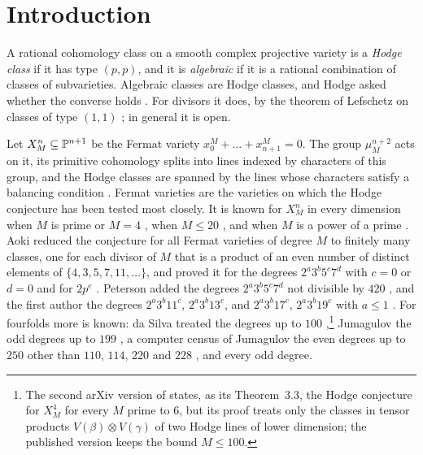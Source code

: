 \section{Introduction}\label{sec:intro}

A rational cohomology class on a smooth complex projective variety is a
\emph{Hodge class} if it has type $(p,p)$, and it is \emph{algebraic} if it
is a rational combination of classes of subvarieties. Algebraic classes are
Hodge classes, and Hodge asked whether the converse holds \cite{Hod52}. For
divisors it does, by the theorem of Lefschetz on classes of type $(1,1)$
\cite{Lef24}; in general it is open.

Let $X^{n}_{M}\subseteq\mathbb{P}^{n+1}$ be the Fermat variety
$x_{0}^{M}+\dots+x_{n+1}^{M}=0$. The group $\mu_{M}^{n+2}$ acts on it, its
primitive cohomology splits into lines indexed by characters of this group,
and the Hodge classes are spanned by the lines whose characters satisfy a
balancing condition \cite{Shi79}. Fermat varieties are the varieties on which
the Hodge conjecture has been tested most closely. It is known for
$X^{n}_{M}$ in every dimension when $M$ is prime or $M=4$
\cite{Ran80,Shi79}, when $M\le20$ \cite{Shi79}, and when $M$ is a power of a
prime \cite{Aok87}. Aoki reduced the conjecture for all Fermat varieties of
degree $M$ to finitely many classes, one for each divisor of $M$ that is a
product of an even number of distinct elements of $\{4,3,5,7,11,\dots\}$,
and proved it for the degrees $2^{a}3^{b}5^{c}7^{d}$ with $c=0$ or $d=0$ and
for $2p^{e}$ \cite{Aok83,Aok00}. Peterson added the degrees
$2^{a}3^{b}5^{c}7^{d}$ not divisible by $420$ \cite{Pet26}, and the first
author the degrees $2^{a}3^{b}11^{c}$, $2^{a}3^{b}13^{c}$, and
$2^{a}3^{b}17^{c}$, $2^{a}3^{b}19^{c}$ with $a\le1$ \cite{BBe84hc}. For
fourfolds more is known: da Silva treated the degrees up to
$100$ \cite{daS21},\footnote{The second arXiv version of \cite{daS21}
states, as its Theorem~3.3, the Hodge conjecture for $X^{4}_{M}$ for every
$M$ prime to $6$, but its proof treats only the classes in tensor products
$V(\beta)\otimes V(\gamma)$ of two Hodge lines of lower dimension; the
published version keeps the bound $M\le100$.} Jumagulov the odd degrees up
to $199$ \cite{Jum26}, a computer census of Jumagulov the even degrees up to
$250$ other than $110$, $114$, $220$ and $228$ \cite{Jum26b}, and
\cite[Theorem~B]{BBe84hc} every odd degree.


